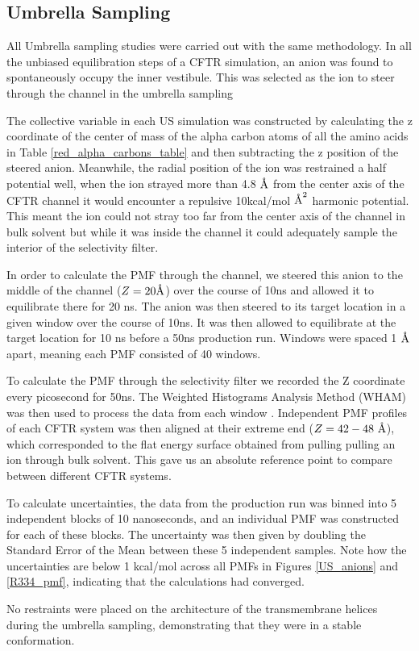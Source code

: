 \subsection{Umbrella Sampling}
All Umbrella sampling studies were carried out with the same methodology. In all the unbiased equilibration steps of a CFTR simulation, an anion was found to spontaneously occupy the inner vestibule. This was selected as the ion to steer through the channel in the umbrella sampling

The collective variable in each US simulation was constructed by calculating the z coordinate of the center of mass of the alpha carbon atoms of all the amino acids in Table \ref{red_alpha_carbons_table} and then subtracting the z position of the steered anion. Meanwhile, the radial position of the ion was restrained a half potential well, when the ion strayed more than 4.8 $\textup{\AA}$ from the center axis of the CFTR channel it would encounter a repulsive 10kcal/mol $\textup{\AA}^2$ harmonic potential. This meant the ion could not stray too far from the center axis of the channel in bulk solvent but while it was inside the channel it could adequately sample the interior of the selectivity filter.

In order to calculate the PMF through the channel, we steered this anion to the middle of the channel ($Z=20\textup{\AA}$) over the course of 10ns and allowed it to equilibrate there for 20 ns. The anion was then steered to its target location in a given window over the course of 10ns. It was then allowed to equilibrate at the target location for 10 ns before a 50ns production run. Windows were spaced 1 $\textup{\AA}$ apart, meaning each PMF consisted of 40 windows.

To calculate the PMF through the selectivity filter we recorded the Z coordinate every picosecond for 50ns. The Weighted Histograms Analysis Method (WHAM) was then used to process the data from each window \cite{grossfield2012}. Independent PMF profiles of each CFTR system was then aligned at their extreme end ($Z=42-48\ \textup{\AA}$), which corresponded to the flat energy surface obtained from pulling pulling an ion through bulk solvent. This gave us an absolute reference point to compare between different CFTR systems. 

To calculate uncertainties, the data from the production run was binned into 5 independent blocks of 10 nanoseconds, and an individual PMF was constructed for each of these blocks. The uncertainty was then given by doubling the Standard Error of the Mean between these 5 independent samples. Note how the uncertainties are below 1 kcal/mol across all PMFs in Figures \ref{US_anions} and \ref{R334_pmf}, indicating that the calculations had converged.

No restraints were placed on the architecture of the transmembrane helices during the umbrella sampling, demonstrating that they were in a stable conformation. 
